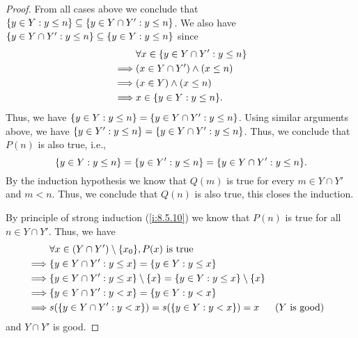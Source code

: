 \begin{proof}
  From all cases above we conclude that \(\left\lbrace y \in Y : y \leq n\right\rbrace \subseteq \left\lbrace y \in Y \cap Y' : y \leq n\right\rbrace\).
  We also have \(\left\lbrace y \in Y \cap Y' : y \leq n\right\rbrace \subseteq \left\lbrace y \in Y : y \leq n\right\rbrace\) since
  \begin{align*}
             & \forall x \in \set{y \in Y \cap Y' : y \leq n} \\
    \implies & (x \in Y \cap Y') \land (x \leq n)             \\
    \implies & (x \in Y) \land (x \leq n)                     \\
    \implies & x \in \set{y \in Y : y \leq n}.
  \end{align*}
  Thus, we have \(\left\lbrace y \in Y : y \leq n\right\rbrace = \left\lbrace y \in Y \cap Y' : y \leq n\right\rbrace\).
  Using similar arguments above, we have \(\left\lbrace y \in Y' : y \leq n\right\rbrace = \left\lbrace y \in Y \cap Y' : y \leq n\right\rbrace\).
  Thus, we conclude that \(P(n)\) is also true, i.e.,
  \[
    \set{y \in Y : y \leq n} = \set{y \in Y' : y \leq n} = \set{y \in Y \cap Y' : y \leq n}.
  \]
  By the induction hypothesis we know that \(Q(m)\) is true for every \(m \in Y \cap Y'\) and \(m < n\).
  Thus, we conclude that \(Q(n)\) is also true, this closes the induction.

  By principle of strong induction (\cref{i:8.5.10}) we know that \(P(n)\) is true for all \(n \in Y \cap Y'\).
  Thus, we have
  \begin{align*}
             & \forall x \in (Y \cap Y') \setminus \set{x_0}, P(x) \text{ is true}                                                         \\
    \implies & \set{y \in Y \cap Y' : y \leq x} = \set{y \in Y : y \leq x}                                                                 \\
    \implies & \set{y \in Y \cap Y' : y \leq x} \setminus \set{x} = \set{y \in Y : y \leq x} \setminus \set{x}                             \\
    \implies & \set{y \in Y \cap Y' : y < x} = \set{y \in Y : y < x}                                                                       \\
    \implies & s(\set{y \in Y \cap Y' : y < x}) = s(\set{y \in Y : y < x}) = x                                 &  & \text{(\(Y\) is good)}
  \end{align*}
  and \(Y \cap Y'\) is good.


\end{proof}
